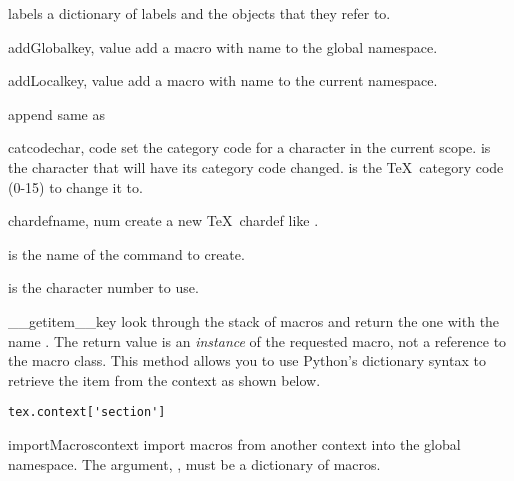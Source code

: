 \begin{memberdesc}[Context]{labels}
a dictionary of labels and the objects that they refer to.
\end{memberdesc}



\begin{methoddesc}[Context]{addGlobal}{key, value}
add a macro  with name  to the global namespace.
\end{methoddesc}

\begin{methoddesc}[Context]{addLocal}{key, value}
add a macro  with name  to the current namespace.
\end{methoddesc}

\begin{methoddesc}[Context]{append}{}
same as 
\end{methoddesc}

\begin{methoddesc}[Context]{catcode}{char, code}
set the category code for a character in the current scope.  
is the character that will have its category code changed.  
is the \TeX\ category code (0-15) to change it to.
\end{methoddesc}

\begin{methoddesc}[Context]{chardef}{name, num}
create a new \TeX\ chardef like .

 is the name of the command to create.

 is the character number to use.
\end{methoddesc}

\begin{methoddesc}[Context]{__getitem__}{key}
look through the stack of macros and return the one with the name .
The return value is an \emph{instance} of the requested macro,
not a reference to the macro class.
This method allows you to use Python's dictionary syntax to retrieve
the item from the context as shown below.
\begin{verbatim}
tex.context['section']
\end{verbatim}
\end{methoddesc}

\begin{methoddesc}[Context]{importMacros}{context}
import macros from another context into the global namespace.  The argument,
, must be a dictionary of macros.
\end{methoddesc}

